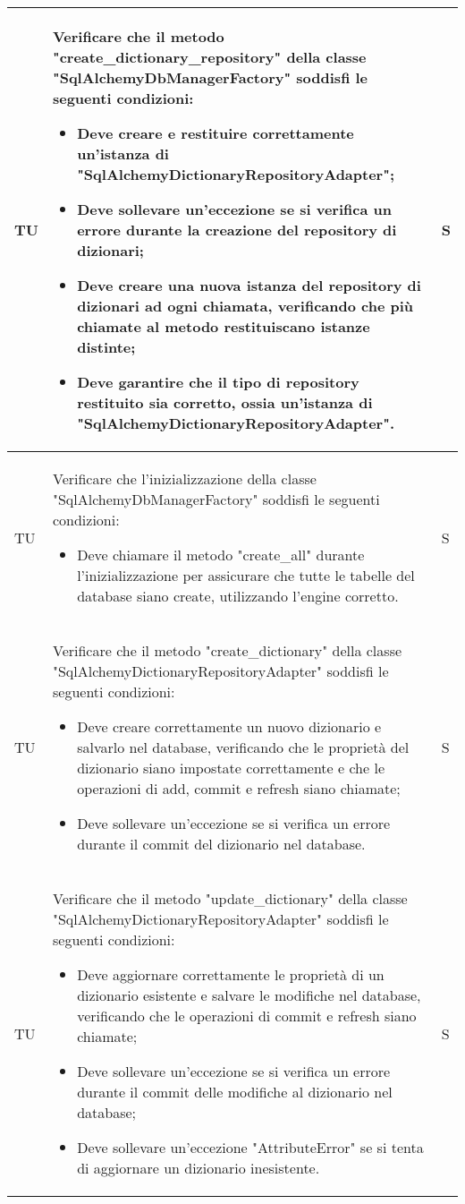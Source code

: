 \begin{adjustwidth}{-0.5cm}{-0.5cm}
\begin{longtable}{|P{1.5cm}|>{\raggedright}P{9.5cm}|>{\arraybackslash}P{1.5cm}|}
		\hline TU & Verificare che il metodo "create\_dictionary\_repository" della classe "SqlAlchemyDbManagerFactory" soddisfi le seguenti condizioni:
	\begin{itemize}
		\item Deve creare e restituire correttamente un'istanza di "SqlAlchemyDictionaryRepositoryAdapter";
		\item Deve sollevare un'eccezione se si verifica un errore durante la creazione del repository di dizionari;
		\item Deve creare una nuova istanza del repository di dizionari ad ogni chiamata, verificando che più chiamate al metodo restituiscano istanze distinte;
		\item Deve garantire che il tipo di repository restituito sia corretto, ossia un'istanza di "SqlAlchemyDictionaryRepositoryAdapter".
	\end{itemize} & S \\

		\hline TU & Verificare che l'inizializzazione della classe "SqlAlchemyDbManagerFactory" soddisfi le seguenti condizioni:
	\begin{itemize}
		\item Deve chiamare il metodo "create\_all" durante l'inizializzazione per assicurare che tutte le tabelle del database siano create, utilizzando l'engine corretto.
	\end{itemize} & S \\

		\hline TU & Verificare che il metodo "create\_dictionary" della classe "SqlAlchemyDictionaryRepositoryAdapter" soddisfi le seguenti condizioni:
	\begin{itemize}
		\item Deve creare correttamente un nuovo dizionario e salvarlo nel database, verificando che le proprietà del dizionario siano impostate correttamente e che le operazioni di add, commit e refresh siano chiamate;
		\item Deve sollevare un'eccezione se si verifica un errore durante il commit del dizionario nel database.
	\end{itemize} & S \\

	\hline TU & Verificare che il metodo "update\_dictionary" della classe "SqlAlchemyDictionaryRepositoryAdapter" soddisfi le seguenti condizioni:
	\begin{itemize}
		\item Deve aggiornare correttamente le proprietà di un dizionario esistente e salvare le modifiche nel database, verificando che le operazioni di commit e refresh siano chiamate;
		\item Deve sollevare un'eccezione se si verifica un errore durante il commit delle modifiche al dizionario nel database;
		\item Deve sollevare un'eccezione "AttributeError" se si tenta di aggiornare un dizionario inesistente.
	\end{itemize} & S \\


\end{longtable}
\end{adjustwidth}
